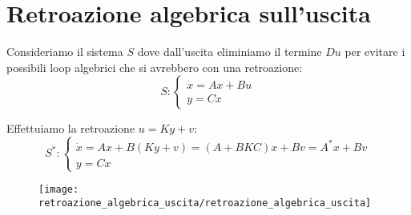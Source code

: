 \documentclass[../main.tex]{subfiles}
\begin{document}
	\section{Retroazione algebrica sull'uscita}
		Consideriamo il sistema $ S $ dove dall'uscita eliminiamo il termine $ Du $ per evitare i possibili loop algebrici che si avrebbero con una retroazione:
		\[
			S:
			\begin{cases}
				\dot x = Ax+Bu\\
				y = Cx
			\end{cases}
		\]
	
		Effettuiamo la retroazione $ u = Ky +v $:
		\[
			S^{*}:
			\begin{cases}
				\dot x = Ax + B(Ky+v) = (A+BKC)x + Bv = A^{*}x + Bv\\
				y = Cx
			\end{cases}
		\]
		
		\begin{figure}[h!]
			\centering\texttt{[image: retroazione\_algebrica\_uscita/retroazione\_algebrica\_uscita]}
		\end{figure}
	
\end{document}
